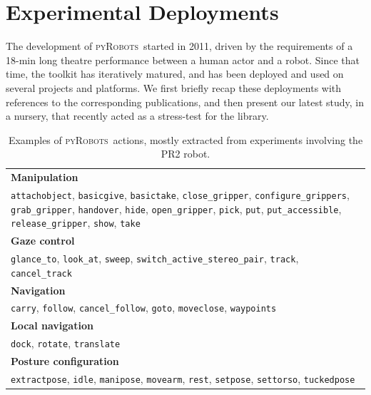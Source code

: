 \documentclass[a4paper, 10pt, conference]{ieeeconf}      %
\newcommand{\pyRobots}{\textsc{pyRobots}\ }
\begin{document}
\section{Experimental Deployments}

The development of \pyRobots started in 2011, driven by the requirements of a
18-min long theatre performance between a human actor and a robot. Since that time, the toolkit has
iteratively matured, and has been deployed and used on several projects and
platforms. We first briefly recap these deployments with references to the
corresponding publications, and then present our latest study, in a nursery,
that recently acted as a stress-test for the library.

\begin{table}[ht!]
\begin{center}
\begin{tabular}{p{}}
\hline
    {\bf Manipulation} \\
     {\tt attachobject}, {\tt basicgive}, {\tt basictake}, {\tt close\_gripper}, {\tt configure\_grippers}, {\tt grab\_gripper}, {\tt handover}, {\tt hide}, {\tt open\_gripper}, {\tt pick}, {\tt put}, {\tt put\_accessible}, {\tt release\_gripper}, {\tt show}, {\tt take} \\
\hline
    {\bf Gaze control} \\
     {\tt glance\_to}, {\tt look\_at}, {\tt sweep}, {\tt switch\_active\_stereo\_pair}, {\tt track}, {\tt cancel\_track} \\
\hline
    {\bf Navigation} \\
     {\tt carry}, {\tt follow}, {\tt cancel\_follow}, {\tt goto}, {\tt moveclose}, {\tt waypoints} \\
\hline
    {\bf Local navigation} \\
     {\tt dock}, {\tt rotate}, {\tt translate} \\
\hline
    {\bf Posture configuration} \\
     {\tt extractpose}, {\tt idle}, {\tt manipose}, {\tt movearm}, {\tt rest}, {\tt setpose}, {\tt settorso}, {\tt tuckedpose} \\
\hline
\end{tabular}
\end{center}
\caption{Examples of \pyRobots actions, mostly extracted from experiments involving
    the PR2 robot.}

\label{pyrobots_actions}
\end{table}
\end{document}
